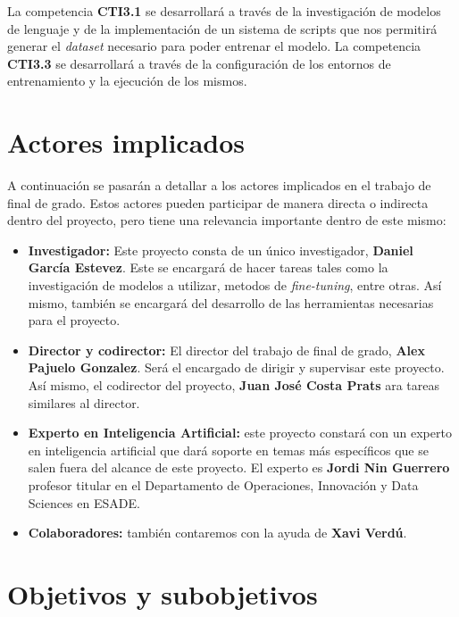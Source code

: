 La competencia \textbf{CTI3.1} se desarrollará a través de la investigación de modelos de
lenguaje y de la implementación de un sistema de scripts que nos permitirá generar
el \textit{dataset} necesario para poder entrenar el modelo. La competencia \textbf{CTI3.3}
se desarrollará a través de la configuración de los entornos de entrenamiento y
la ejecución de los mismos.

\section{Actores implicados}
\label{sec:actores}


A continuación se pasarán a detallar a los actores implicados en el trabajo de final
de grado. Estos actores pueden participar de manera directa o indirecta dentro del
proyecto, pero tiene una relevancia importante dentro de este mismo:

\begin{itemize}
    \item \textbf{Investigador:} Este proyecto consta de un único investigador, \textbf{Daniel
        García Estevez}. Este se encargará de hacer tareas tales como la investigación
        de modelos a utilizar, metodos de \textit{fine-tuning}, entre otras. Así mismo,
        también se encargará del desarrollo de las herramientas necesarias para el proyecto.
    \item \textbf{Director y codirector:} El director del trabajo de final de grado,\textbf{ Alex
        Pajuelo Gonzalez}. Será el encargado de dirigir y supervisar este proyecto. Así
        mismo, el codirector del proyecto, \textbf{Juan José Costa Prats} ara tareas similares al director.
    \item \textbf{Experto en Inteligencia Artificial:} este proyecto constará con un experto en
        inteligencia artificial que dará soporte en temas más específicos que se salen fuera del
        alcance de este proyecto. El experto es \textbf{Jordi Nin Guerrero} profesor titular en el
        Departamento de Operaciones, Innovación y Data Sciences en ESADE.
    \item \textbf{Colaboradores:} también contaremos con la ayuda de \textbf{Xavi Verdú}.
\end{itemize}

\section{Objetivos y subobjetivos}
\label{sec:objetivos}

